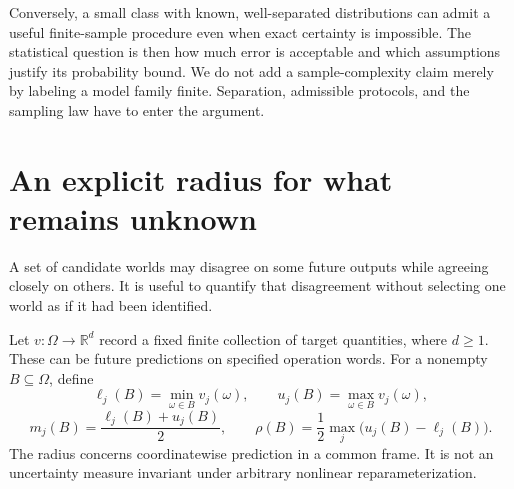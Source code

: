 Conversely, a small class with known, well-separated distributions can admit a useful finite-sample procedure even when exact certainty is impossible. The statistical question is then how much error is acceptable and which assumptions justify its probability bound. We do not add a sample-complexity claim merely by labeling a model family finite. Separation, admissible protocols, and the sampling law have to enter the argument.

\section{An explicit radius for what remains unknown}\label{GA:sec:radius}
A set of candidate worlds may disagree on some future outputs while agreeing closely on others. It is useful to quantify that disagreement without selecting one world as if it had been identified.

Let $v:\Omega\to\mathbb R^d$ record a fixed finite collection of target quantities, where $d\ge1$. These can be future predictions on specified operation words. For a nonempty $B\subseteq\Omega$, define
\[
\ell_j(B)=\min_{\omega\in B}v_j(\omega),\qquad
u_j(B)=\max_{\omega\in B}v_j(\omega),
\]
\[
m_j(B)=\frac{\ell_j(B)+u_j(B)}2,\qquad
\rho(B)=\frac12\max_j\bigl(u_j(B)-\ell_j(B)\bigr).\tag{5}
\]
The radius concerns coordinatewise prediction in a common frame. It is not an uncertainty measure invariant under arbitrary nonlinear reparameterization.

